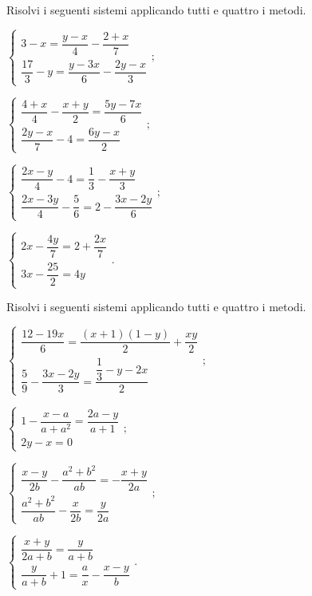 \begin{esercizio}[\Ast]
 \label{ese:21.31}
Risolvi i seguenti sistemi applicando tutti e quattro i metodi.
\begin{multicols}{2}
\begin{enumeratea}{\longarray
\item $\left\{\begin{array}{l}3-x=\dfrac{y-x}{4}-\dfrac{2+x}{7}\\\dfrac{17}{3}-y=\dfrac{y-3x}{6}-\dfrac{2y-x}{3}\end{array}\right.;$
\item $\left\{\begin{array}{l}\dfrac{4+x}{4}-\dfrac{x+y}{2}=\dfrac{5y-7x}{6}\\\dfrac{2y-x}{7}-4=\dfrac{6y-x}{2}\end{array}\right.;$
\item $\left\{\begin{array}{l}\dfrac{2x-y}{4}-4=\dfrac{1}{3}-\dfrac{x+y}{3}\\\dfrac{2x-3y}{4}-\dfrac{5}{6}=2-\dfrac{3x-2y}{6}\end{array}\right.;$
\item $\left\{\begin{array}{l}2x-\dfrac{4y}{7}=2+\dfrac{2x}{7}\\3x-\dfrac{25}{2}=4y\end{array}\right..$}
\end{enumeratea}
\end{multicols}
\end{esercizio}

\begin{esercizio}[\Ast] %
 \label{ese:21.32}
Risolvi i seguenti sistemi applicando tutti e quattro i metodi.
\begin{multicols}{2}
\begin{enumeratea}{\longarray
\item $\left\{\begin{array}{l}\dfrac{12-19x}{6}=\dfrac{(x+1)(1-y)}{2}+\dfrac{xy}{2}\\\dfrac{5}{9}-\dfrac{3x-2y}{3}=\dfrac{\dfrac{1}{3}-y-2x}{2}\end{array}\right.;$
\item $\left\{\begin{array}{l}1-\dfrac{x-a}{a+a^{2}}=\dfrac{2a-y}{a+1}\\2y-x=0\end{array}\right.;$
\item $\left\{\begin{array}{l}\dfrac{x-y}{2b}-\dfrac{a^{2}+b^{2}}{ab}=-\dfrac{x+y}{2a}\\\dfrac{a^{2}+b^{2}}{ab}-\dfrac{x}{2b}=\dfrac{y}{2a}\end{array}\right.;$
\item $\left\{\begin{array}{l}\dfrac{x+y}{2a+b}=\dfrac{y}{a+b}\\\dfrac{y}{a+b}+1=\dfrac{a}{x}-\dfrac{x-y}{b}\end{array}\right..$}
\end{enumeratea}
\end{multicols}
\end{esercizio}


